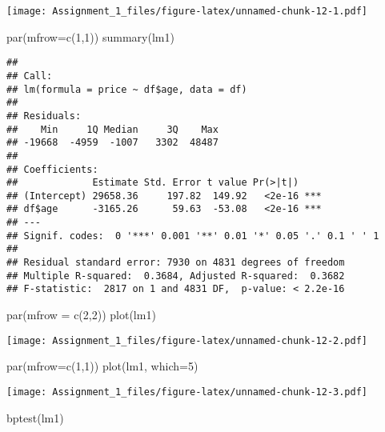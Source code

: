 \documentclass[
]{article}
\newenvironment{Shaded}{\begin{snugshade}}{\end{snugshade}}
\newcommand{\AttributeTok}[1]{\textcolor[rgb]{0.77,0.63,0.00}{#1}}
\newcommand{\DecValTok}[1]{\textcolor[rgb]{0.00,0.00,0.81}{#1}}
\newcommand{\FunctionTok}[1]{\textcolor[rgb]{0.00,0.00,0.00}{#1}}
\newcommand{\NormalTok}[1]{#1}
\begin{document}
\texttt{[image: Assignment\_1\_files/figure-latex/unnamed-chunk-12-1.pdf]}

\begin{Shaded}
\begin{Highlighting}[]
\FunctionTok{par}\NormalTok{(}\AttributeTok{mfrow=}\FunctionTok{c}\NormalTok{(}\DecValTok{1}\NormalTok{,}\DecValTok{1}\NormalTok{))}
\FunctionTok{summary}\NormalTok{(lm1)}
\end{Highlighting}
\end{Shaded}

\begin{verbatim}
## 
## Call:
## lm(formula = price ~ df$age, data = df)
## 
## Residuals:
##    Min     1Q Median     3Q    Max 
## -19668  -4959  -1007   3302  48487 
## 
## Coefficients:
##             Estimate Std. Error t value Pr(>|t|)    
## (Intercept) 29658.36     197.82  149.92   <2e-16 ***
## df$age      -3165.26      59.63  -53.08   <2e-16 ***
## ---
## Signif. codes:  0 '***' 0.001 '**' 0.01 '*' 0.05 '.' 0.1 ' ' 1
## 
## Residual standard error: 7930 on 4831 degrees of freedom
## Multiple R-squared:  0.3684, Adjusted R-squared:  0.3682 
## F-statistic:  2817 on 1 and 4831 DF,  p-value: < 2.2e-16
\end{verbatim}

\begin{Shaded}
\begin{Highlighting}[]
\FunctionTok{par}\NormalTok{(}\AttributeTok{mfrow =} \FunctionTok{c}\NormalTok{(}\DecValTok{2}\NormalTok{,}\DecValTok{2}\NormalTok{))}
\FunctionTok{plot}\NormalTok{(lm1)}
\end{Highlighting}
\end{Shaded}

\texttt{[image: Assignment\_1\_files/figure-latex/unnamed-chunk-12-2.pdf]}

\begin{Shaded}
\begin{Highlighting}[]
\FunctionTok{par}\NormalTok{(}\AttributeTok{mfrow=}\FunctionTok{c}\NormalTok{(}\DecValTok{1}\NormalTok{,}\DecValTok{1}\NormalTok{))}
\FunctionTok{plot}\NormalTok{(lm1, }\AttributeTok{which=}\DecValTok{5}\NormalTok{)}
\end{Highlighting}
\end{Shaded}

\texttt{[image: Assignment\_1\_files/figure-latex/unnamed-chunk-12-3.pdf]}

\begin{Shaded}
\begin{Highlighting}[]
\FunctionTok{bptest}\NormalTok{(lm1)}
\end{Highlighting}
\end{Shaded}
\end{document}
